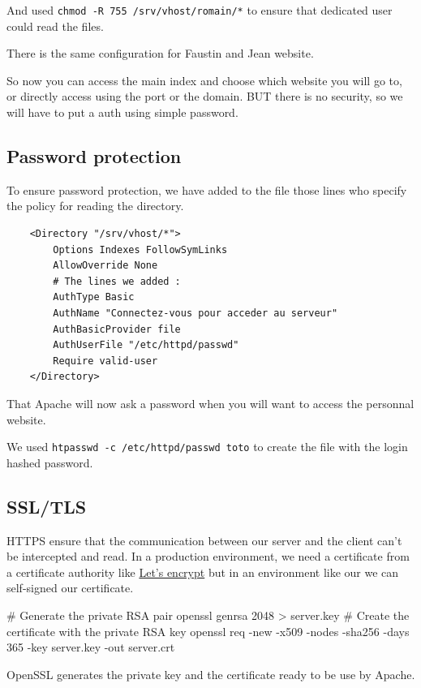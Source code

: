\documentclass[11pt]{article}
\begin{document}
And used \texttt{chmod -R 755 /srv/vhost/romain/*} to ensure that dedicated user  could read the files.

There is the same configuration for Faustin and Jean website.

So now you can access the main index and choose which website you will go to, or directly access using the port or the domain. BUT there is no security, so we will have to put a auth using simple password.

\subsection{Password protection}
To ensure password protection, we have added to the  file those lines who specify the policy for reading the directory.
\begin{verbatim}
    <Directory "/srv/vhost/*">
        Options Indexes FollowSymLinks
        AllowOverride None
        # The lines we added :
        AuthType Basic
        AuthName "Connectez-vous pour acceder au serveur"
        AuthBasicProvider file
        AuthUserFile "/etc/httpd/passwd"
        Require valid-user
    </Directory>
\end{verbatim}

That Apache will now ask a password when you will want to access the personnal website.

We used \texttt{htpasswd -c /etc/httpd/passwd toto} to create the file with the login  hashed password.
\subsection{SSL/TLS}

HTTPS ensure that the communication between our server and the client can't be intercepted and read. In a production environment, we need a certificate from a certificate authority like \href{https://letsencrypt.org/}{Let's encrypt} but in an environment like our we can self-signed our certificate.

\begin{bash}
    # Generate the private RSA pair
    openssl genrsa 2048 > server.key
    # Create the certificate with the private RSA key
    openssl req -new -x509 -nodes -sha256 -days 365 -key server.key -out server.crt
\end{bash}

OpenSSL generates the private key and the certificate ready to be use by Apache.
\end{document}
